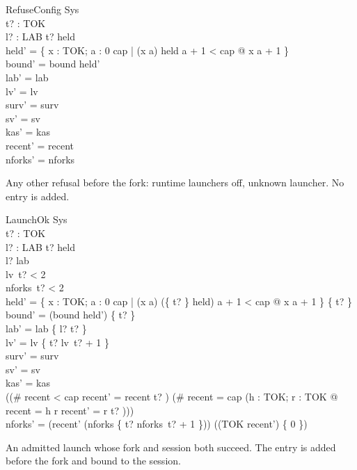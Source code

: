 \documentclass[a4paper,10pt,fleqn]{article}
\begin{document}
\begin{schema}{RefuseConfig}
  \Delta Sys \\
  t? : TOK \\ l? : LAB
\where
  t? \notin \dom held \\
  held' = \{ x : TOK; a : 0 \upto cap | (x \mapsto a) \in held \land a + 1 < cap @ x \mapsto a + 1 \} \\
  bound' = bound \cap \dom held' \\
  lab' = lab \\
  lv' = lv \\
  surv' = surv \\
  sv' = sv \\
  kas' = kas \\
  recent' = recent \\
  nforks' = nforks
\end{schema}

Any other refusal before the fork: runtime launchers off, unknown launcher. No entry is added.

\begin{schema}{LaunchOk}
  \Delta Sys \\
  t? : TOK \\ l? : LAB
\where
  t? \notin \dom held \\
  l? \notin \dom lab \\
  lv~t? < 2 \\
  nforks~t? < 2 \\
  held' = \{ x : TOK; a : 0 \upto cap | (x \mapsto a) \in (\{ t? \} \ndres held) \land a + 1 < cap @ x \mapsto a + 1 \} \cup \{ t?  \} \\
  bound' = (bound \cap \dom held') \cup \{ t? \} \\
  lab' = lab \cup \{ l? \mapsto t? \} \\
  lv' = lv \oplus \{ t? \mapsto lv~t? + 1 \} \\
  surv' = surv \\
  sv' = sv \\
  kas' = kas \\
  ((\# recent < cap \land recent' = recent \cat \langle t? \rangle) \lor (\# recent = cap \land (\exists h : TOK; r : \seq TOK @ recent = \langle h \rangle \cat r \land recent' = r \cat \langle t? \rangle))) \\
  nforks' = (\ran recent' \dres (nforks \oplus \{ t? \mapsto nforks~t? + 1 \})) \cup ((TOK \setminus \ran recent') \cross \{ 0 \})
\end{schema}

An admitted launch whose fork and session both succeed. The entry is added before the fork and bound to the session.
\end{document}
